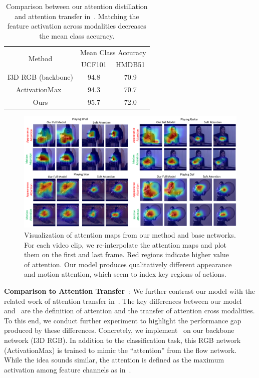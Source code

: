 \documentclass[10pt,twocolumn,letterpaper]{article}
\begin{document}
\begin{table}[t]
\centering
\footnotesize
\begin{tabular}{c|cc}
\multirow{2}{*}{Method}                        & \multicolumn{2}{c}{Mean Class Accuracy} \\
                                               & UCF101   & HMDB51 \\ \hline
I3D RGB (backbone)                             & 94.8     & 70.9   \\
ActivationMax~\cite{Zagoruyko2017AT}           & 94.3     & 70.7   \\
Ours                                           & 95.7     & 72.0   \\ 
\end{tabular}
\vspace{0.1em}
\caption{Comparison between our attention distillation and attention transfer in~\cite{Zagoruyko2017AT}. Matching the feature activation across modalities decreases the mean class accuracy.}
\label{table:transfer}
\end{table}

\begin{figure}[t]
\centering
\includegraphics[width=0.9\linewidth]{figures/vis.pdf}
\caption{Visualization of attention maps from our method and base networks. For each video clip, we re-interpolate the attention maps and plot them on the first and last frame. Red regions indicate higher value of attention. Our model produces qualitatively different appearance and motion attention, which seem to index key regions of actions.}
\label{fig:vis}
\vspace{-1em}
\end{figure}

\noindent \textbf{Comparison to Attention Transfer~\cite{Zagoruyko2017AT}}: We further contrast our model with the related work of attention transfer in~\cite{Zagoruyko2017AT}. The key differences between our model and~\cite{Zagoruyko2017AT} are the definition of attention and the transfer of attention cross modalities. To this end, we conduct further experiment to highlight the performance gap produced by these differences. Concretely, we implement~\cite{Zagoruyko2017AT} on our backbone network (I3D RGB). In addition to the classification task, this RGB network (ActivationMax) is trained to mimic the ``attention'' from the flow network. While the idea sounds similar, the attention is defined as the maximum activation among feature channels as in~\cite{Zagoruyko2017AT}. 
\end{document}

